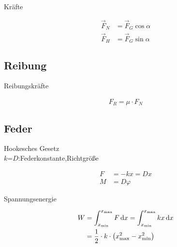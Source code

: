 \begin{boxleft}Kräfte\\
\end{boxleft}\begin{boxrightshaded}
\begin{align}
\vec{F}_N&=\vec{F}_G\cos\alpha\\
\vec{F}_H&=\vec{F}_G\sin\alpha
\end{align}
\end{boxrightshaded}

\subsection{Reibung}

\begin{boxleft}Reibungskräfte
\end{boxleft}\begin{boxrightshaded}
\begin{align}
F_R=\mu\cdot F_N
\end{align}
\end{boxrightshaded}

\subsection{Feder}


\begin{boxleft}Hookesches Gesetz\\
$k$=$D$:Federkonstante,Richtgröße
\end{boxleft}\begin{boxrightshaded}
\begin{align}
F&=-kx=Dx\\
M&=D\varphi
\end{align}
\end{boxrightshaded}

\begin{boxleft}Spannungsenergie
\end{boxleft}\begin{boxrightshaded}
\begin{align}
W	&=\int_{x_\text{min}}^{x_\text{max}}F\mathop{}\!\mathrm{d} x=\int_{x_\text{min}}^{x_\text{max}}kx\mathop{}\!\mathrm{d} x\\
	&=\frac{1}{2}\cdot k\cdot \left(x_{\text{max}}^2-x_{\text{min}}^2\right)
\end{align}
\end{boxrightshaded}


